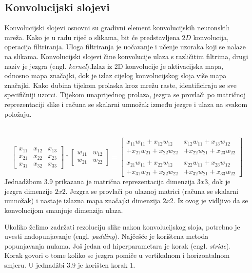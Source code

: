 \documentclass[times, utf8, zavrsni, numeric]{fer}
\begin{document}
\subsection{Konvolucijski slojevi}
Konvolucijski slojevi osnovni su gradivni element konvolucijskih neuronskih mreža. Kako je u radu riječ o slikama, bit će predstavljena $2D$ konvolucija, operacija filtriranja. Uloga filtriranja je uočavanje i učenje uzoraka koji se nalaze na slikama. 
Konvolucijski slojevi čine konvolucije ulaza s različitim filtrima, drugi naziv je jezgra (engl. \textit{kernel}).Izlaz iz 2D konvolucije je aktivacijska mapa, odnosno mapa značajki, dok je izlaz cijelog konvolucijskog sloja više mapa značajki. Kako dubina tijekom prolaska kroz mrežu raste, identificiraju se sve specifičniji uzorci. Tijekom unaprijednog prolaza, jezgra se provlači po matričnoj reprezentaciji slike i računa se skalarni umnožak između jezgre i ulaza na svakom položaju. 
\\\\\\
\begin{equation}
\begin{bmatrix}
x_{11} & x_{12} & x_{13} \\
x_{21} & x_{22} & x_{23} \\ 
x_{31} & x_{32} & x_{33}
\end{bmatrix}*\begin{bmatrix}
w_{11} & w_{12} \\
w_{21} & w_{22}
\end{bmatrix}=
\begin{bmatrix}
x_{11}w_{11} + x_{12}w_{12} & x_{12}w_{11} + x_{13}w_{12}\\+ x_{21}w_{21} + x_{22}w_{22} &   + x_{22}w_{21} + x_{23}w_{22}\\ 
\\
x_{21}w_{11} + x_{22}w_{12} & x_{22}w_{11} + x_{23}w_{12}\\+ x_{31}w_{21} + x_{32}w_{22} &  +x_{32}w_{21} + x_{33}w_{22}
\end{bmatrix}
\label{eq:Aktivacija}
\end{equation}
\linebreak
Jednadžbom 3.9 prikazana je matrična reprezentacija dimenzija $3x3$, dok je jezgra dimenzije $2x2$. Jezgra se provlači po ulaznoj matrici (računa se skalarni umnožak) i nastaje izlazna mapa značajki dimenzija $2x2$. Iz ovog je vidljivo da se konvolucijom smanjuje dimenzija ulaza.

Ukoliko želimo zadržati rezoluciju slike nakon konvolucijskog sloja, potrebno je uvesti nadopunjavanje (engl. \textit{padding}). Najčešće je korištena metoda popunjavanja nulama. Još jedan od hiperparametara je korak (engl. \textit{stride}). Korak govori o tome koliko se jezgra pomiče u vertikalnom i horizontalnom smjeru. U jednadžbi 3.9 je korišten korak 1.
\end{document}
